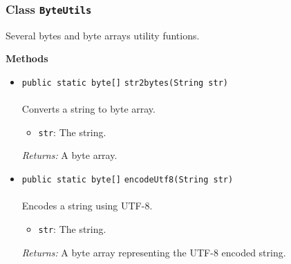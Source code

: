 \subsubsection{Class \lstinline|ByteUtils|}
Several bytes and byte arrays utility funtions. \\
\noindent\begin{minipage}[t]{5cm}
\vspace{0.3em}
\hspace*{2em}
\vspace{0.3em}
\end{minipage}





\textbf{\sffamily Methods}
\begin{itemize}
\item \lstinline|public static byte[]| \lstinline|str2bytes|\lstinline|(String str)|\\ \\[-0.6em]
Converts a string to byte array.
\begin{itemize}
\item \lstinline|str|: The string.
\end{itemize}

\emph{Returns:} A byte array.

\item \lstinline|public static byte[]| \lstinline|encodeUtf8|\lstinline|(String str)|\\ \\[-0.6em]
Encodes a string using UTF-8.
\begin{itemize}
\item \lstinline|str|: The string.
\end{itemize}

\emph{Returns:} A byte array representing the UTF-8 encoded string.

\end{itemize}

